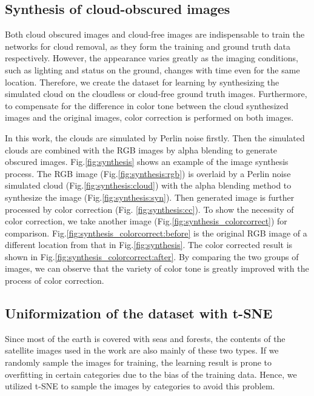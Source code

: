 \documentclass[10pt,twocolumn,letterpaper]{article}
\begin{document}
\subsection{Synthesis of cloud-obscured images}
Both cloud obscured images and cloud-free images are indispensable  to train the networks for cloud removal, as they form the training and  ground truth data respectively. However, the appearance varies greatly as the imaging conditions, such as lighting and status on the ground, changes with time even for the same location. Therefore, we create the dataset for learning by synthesizing the simulated cloud on the cloudless or  cloud-free ground truth images. Furthermore, to compensate for the difference in color tone between the cloud synthesized images and the original images, color correction \cite{hunt2005reproduction,egst20141035} is performed on both images.

In this work, the clouds are simulated by Perlin noise \cite{perlin2002improving} firstly. Then the simulated  clouds are combined with the RGB images by alpha blending to generate obscured images. Fig.\ref{fig:synthesis} shows an example of the image synthesis process. The RGB image (Fig.\ref{fig:synthesis:rgb}) is  overlaid by a Perlin noise simulated cloud (Fig.\ref{fig:synthesis:cloud}) with the alpha blending method to synthesize the image (Fig.\ref{fig:synthesis:syn}). Then generated image is further processed by color correction (Fig. \ref{fig:synthesis:cc}). To show the necessity of color correction, we take another image (Fig.\ref{fig:synthesis_colorcorrect}) for comparison. Fig.\ref{fig:synthesis_colorcorrect:before} is the original RGB image of a different location from that in Fig.\ref{fig:synthesis}. The color corrected result is shown in Fig.\ref{fig:synthesis_colorcorrect:after}. By comparing the two groups of images, we can observe that the variety of color tone is greatly improved with the process of color correction.

\subsection{Uniformization of the dataset with t-SNE}
Since most of the earth is covered with seas and forests, the contents of the satellite images used in the work are also mainly of these two types. If we randomly sample the images for training, the learning result is prone to overfitting in certain categories due to the bias of the training data. Hence, we utilized t-SNE to sample the images by categories to avoid this problem.
\end{document}
